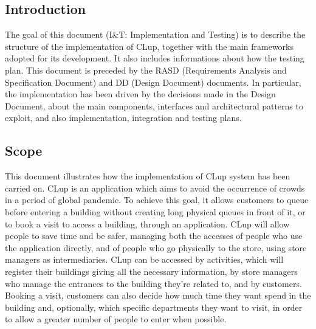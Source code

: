 \renewcommand{\thesubsection}{\Alph{subsection}}
\subsection{Introduction}
The goal of this document (I\&T: Implementation and Testing) is to describe the structure of the implementation of CLup, together with the main frameworks adopted for its development. It also includes informations about how the testing plan. This document is preceded by the RASD (Requirements Analysis and Specification Document) and DD (Design Document) documents. In particular, the implementation has been driven by the decisions made in the Design Document, about the main components, interfaces and architectural patterns to exploit, and also implementation, integration and testing plans.
\subsection{Scope}
This document illustrates how the implementation of CLup system has been carried on. CLup is an application which aims to avoid the occurrence of crowds in a period of global pandemic. To achieve this goal, it allows customers to queue before entering a building without creating long physical queues in front of it, or to book a visit to access a building, through an application. CLup will allow people to save time and be safer, managing both the accesses of people who use the application directly, and of people who go physically to the store, using store managers as intermediaries. CLup can be accessed by activities, which will register their buildings giving all the necessary information, by store managers who manage the entrances to the building they're related to, and by customers. Booking a visit, customers can also decide how much time they want spend in the building and, optionally, which specific departments they want to visit, in order to allow a greater number of people to enter when possible.
\newpage
